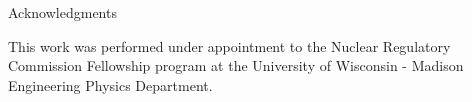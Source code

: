 \documentclass{beamer}
\begin{document}
\begin{frame}{Acknowledgments}

This work was performed under appointment to the Nuclear Regulatory
Commission Fellowship program at the University of Wisconsin - Madison
Engineering Physics Department.

\end{frame}

\end{document}
